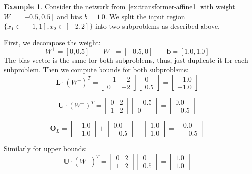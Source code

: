\documentclass[oneside,11pt,dvipsnames]{book}
\numberwithin{equation}{section}
\theoremstyle{definition}
\newtheorem{example}{Example}[section]
\theoremstyle{remark}
\begin{document}
\begin{example}\label{ex:batch-processing}
Consider the network from~\autoref{ex:transformer-affine1} with weight $W = [-0.5, 0.5]$ and bias $b = 1.0$. We split the input region $\{x_1 \in [-1,1], x_2 \in [-2,2]\}$ into two subproblems as described above.

First, we decompose the weight:
\[W^+ = [0, 0.5] \qquad W^- = [-0.5, 0] \qquad \mathbf{b} = [1.0, 1.0]\]
The bias vector is the same for both subproblems, thus, just duplicate it for each subproblem.
Then we compute bounds for both subproblems:
\[
\mathbf{L} \cdot (W^+)^T = \begin{bmatrix} -1 & -2 \\ 0 & -2 \end{bmatrix} \begin{bmatrix} 0 \\ 0.5 \end{bmatrix} = \begin{bmatrix} -1.0 \\ -1.0 \end{bmatrix}
\]

\[
\mathbf{U} \cdot (W^-)^T = \begin{bmatrix} 0 & 2 \\ 1 & 2 \end{bmatrix} \begin{bmatrix} -0.5 \\ 0 \end{bmatrix} = \begin{bmatrix} 0.0 \\ -0.5 \end{bmatrix}
\]

\[
\mathbf{O}_L = \begin{bmatrix} -1.0 \\ -1.0 \end{bmatrix} + \begin{bmatrix} 0.0 \\ -0.5 \end{bmatrix} + \begin{bmatrix} 1.0 \\ 1.0 \end{bmatrix} = \begin{bmatrix} 0.0 \\ -0.5 \end{bmatrix}
\]

Similarly for upper bounds:
\[
\mathbf{U} \cdot (W^+)^T = \begin{bmatrix} 0 & 2 \\ 1 & 2 \end{bmatrix} \begin{bmatrix} 0 \\ 0.5 \end{bmatrix} = \begin{bmatrix} 1.0 \\ 1.0 \end{bmatrix}
\]


\end{example}
\end{document}
